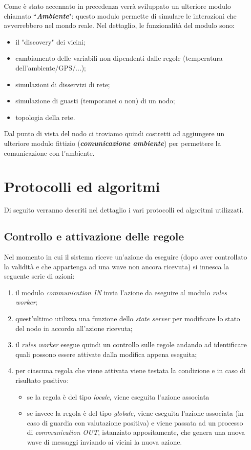 \documentclass{memoir}
\begin{document}
Come è stato accennato in precedenza verrà sviluppato un ulteriore modulo chiamato
``\textbf{\textit{Ambiente}}": questo modulo permette di simulare le interazioni
	   che avverrebbero nel mondo reale. Nel dettaglio, le funzionalità del modulo
	   sono:
\begin{itemize}
	\item il "discovery" dei vicini;
	\item cambiamento delle variabili non dipendenti dalle regole (temperatura dell'ambiente/GPS/...);
	\item simulazioni di disservizi di rete;
	\item simulazione di guasti (temporanei o non) di un nodo;
	\item topologia della rete.
\end{itemize}
Dal punto di vista del nodo ci troviamo quindi costretti ad aggiungere un ulteriore
	   modulo fittizio (\textbf{\textit{comunicazione ambiente}}) per permettere la
	   comunicazione
	   con l'ambiente.

\section{Protocolli ed algoritmi}

Di seguito verranno descriti nel dettaglio i vari protocolli ed algoritmi utilizzati.

\subsection{Controllo e attivazione delle regole}

Nel momento in cui il sistema riceve un'azione da eseguire (dopo aver controllato la validità e che appartenga ad una wave non ancora ricevuta) si innesca la seguente serie di azioni:
\begin{enumerate}
\item il modulo \textit{communication IN} invia l'azione da eseguire al modulo \textit{rules worker};
\item quest'ultimo utilizza una funzione dello \textit{state server} per modificare lo stato del nodo in accordo all'azione ricevuta;
\item il \textit{rules worker} esegue quindi un controllo sulle regole andando ad identificare quali possono essere attivate dalla modifica appena eseguita;
\item per ciascuna regola che viene attivata viene testata la condizione e in caso di risultato positivo:
\begin{itemize}
\item se la regola è del tipo \textit{locale}, viene eseguita l'azione associata
\item se invece la regola è del tipo \textit{globale}, viene eseguita l'azione associata (in caso di guardia con valutazione positiva) e viene passata ad un processo di \textit{communication OUT}, istanziato appositamente, che genera una nuova wave di messaggi inviando ai vicini la nuova azione.
\end{itemize}
\end{enumerate}
\end{document}
